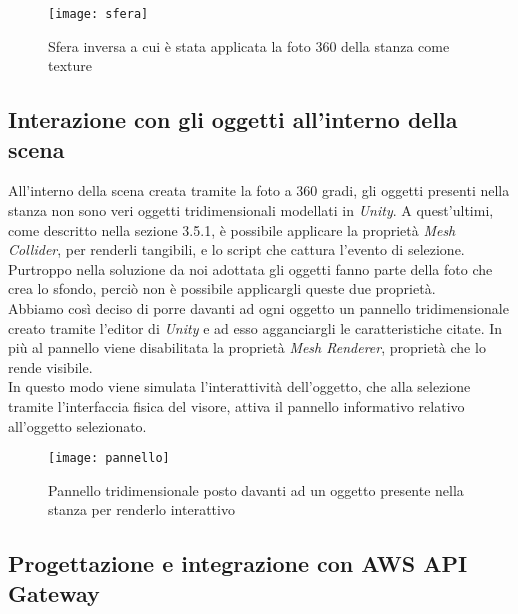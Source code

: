 \label{Sfera}
\begin{figure}[ht]
	\begin{center}
		\texttt{[image: sfera]}
		\caption{Sfera inversa a cui è stata applicata la foto 360 della stanza come texture}
	\end{center}
\end{figure}
\FloatBarrier  

\subsection{Interazione con gli oggetti all'interno della scena} 

All'interno della scena creata tramite la foto a 360 gradi, gli oggetti presenti nella stanza non sono veri oggetti tridimensionali modellati in \textit{Unity}. A quest'ultimi, come descritto nella sezione 3.5.1, è possibile applicare la proprietà \textit{Mesh Collider}, per renderli tangibili, e lo script che cattura l'evento di selezione. Purtroppo nella soluzione da noi adottata gli oggetti fanno parte della foto che crea lo sfondo, perciò non è possibile applicargli queste due proprietà. \\
Abbiamo così deciso di porre davanti ad ogni oggetto un pannello tridimensionale creato tramite l'editor di \textit{Unity} e ad esso agganciargli le caratteristiche citate. In più al pannello viene disabilitata la proprietà \textit{Mesh Renderer}, proprietà che lo rende visibile. \\ 
In questo modo viene simulata l'interattività dell'oggetto, che alla selezione tramite l'interfaccia fisica del visore, attiva il pannello informativo relativo all'oggetto selezionato.

\label{Oggetto Interattivo}
\begin{figure}[ht]
	\begin{center}
		\texttt{[image: pannello]}
		\caption{Pannello tridimensionale posto davanti ad un oggetto presente nella stanza per renderlo interattivo}
	\end{center}
\end{figure}
\FloatBarrier  

\subsection{Progettazione e integrazione con AWS API Gateway}

